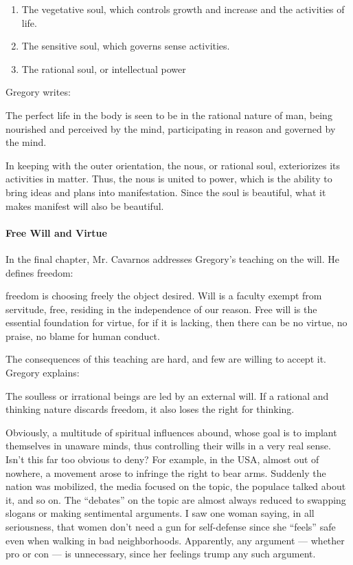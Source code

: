 \begin{enumerate}
\item The vegetative soul, which controls growth and increase and the activities of life. 
\item The sensitive soul, which governs sense activities. 
\item The rational soul, or intellectual power 
\end{enumerate}
Gregory writes:

\begin{quotex}
The perfect life in the body is seen to be in the rational nature of man, being nourished and perceived by the mind, participating in reason and governed by the mind. 

\end{quotex}
In keeping with the outer orientation, the nous, or rational soul, exteriorizes its activities in matter. Thus, the nous is united to power, which is the ability to bring ideas and plans into manifestation. Since the soul is beautiful, what it makes manifest will also be beautiful.

\paragraph{Free Will and Virtue}
In the final chapter, Mr. Cavarnos addresses Gregory's teaching on the will. He defines freedom:

\begin{quotex}
freedom is choosing freely the object desired. Will is a faculty exempt from servitude, free, residing in the independence of our reason. Free will is the essential foundation for virtue, for if it is lacking, then there can be no virtue, no praise, no blame for human conduct. 

\end{quotex}
The consequences of this teaching are hard, and few are willing to accept it. Gregory explains:

\begin{quotex}
The soulless or irrational beings are led by an external will. If a rational and thinking nature discards freedom, it also loses the right for thinking. 

\end{quotex}
Obviously, a multitude of spiritual influences abound, whose goal is to implant themselves in unaware minds, thus controlling their wills in a very real sense. Isn't this far too obvious to deny? For example, in the USA, almost out of nowhere, a movement arose to infringe the right to bear arms. Suddenly the nation was mobilized, the media focused on the topic, the populace talked about it, and so on. The “debates” on the topic are almost always reduced to swapping slogans or making sentimental arguments. I saw one woman saying, in all seriousness, that women don't need a gun for self-defense since she “feels” safe even when walking in bad neighborhoods. Apparently, any argument — whether pro or con — is unnecessary, since her feelings trump any such argument.


